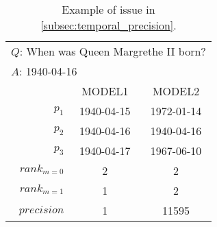 \begin{table}[htb]
\centering
\begin{minipage}{0.95\columnwidth}
\centering
\caption{Example of issue in \autoref{subsec:temporal_precision}. }
\begin{tabular}{rcc}
\multicolumn{3}{l}{$Q$: When was Queen Margrethe II born?} \\
\multicolumn{3}{l}{$A$: 1940-04-16} \vspace{2mm} \\
\hline
{} & \textsc{MODEL1} & \textsc{MODEL2} \\
\hline
$p_1$ & 1940-04-15 & 1972-01-14 \\
$p_2$ & 1940-04-16 & 1940-04-16 \\
$p_3$ & 1940-04-17 & 1967-06-10 \\
\hline
\textsc{$rank_{m=0}$} & 2 & 2 \\
\textsc{$rank_{m=1}$} & 1 & 2 \\
\textsc{$precision$} & 1 & 11595\\
\hline
\end{tabular}
\label{tab:temporal_precision}
\end{minipage}
\end{table}
